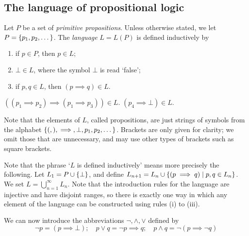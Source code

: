 \subsection{The language of propositional logic}
Let \( P \) be a set of \emph{primitive propositions}.
Unless otherwise stated, we let \( P = \qty{p_1, p_2, \dots} \).
The \emph{language} \( L = L(P) \) is defined inductively by
\begin{enumerate}
    \item if \( p \in P \), then \( p \in L \);
    \item \( \bot \in L \), where the symbol \( \bot \) is read `false';
    \item if \( p, q \in L \), then \( (p \implies q) \in L \).
\end{enumerate}
\begin{example}
    \( ((p_1 \implies p_2) \implies (p_1 \implies p_3)) \in L \).
    \( (p_4 \implies \bot) \in L \).
\end{example}
\begin{remark}
    Note that the elements of \( L \), called propositions, are just strings of symbols from the alphabet \( \qty{(, ), \implies, \bot, p_1, p_2, \dots} \).
    Brackets are only given for clarity; we omit those that are unnecessary, and may use other types of brackets such as square brackets.

    Note that the phrase `\( L \) is defined inductively' means more precisely the following.
    Let \( L_1 = P \cup \qty{\bot} \), and define \( L_{n+1} = L_n \cup \qty{(p \implies q) \mid p, q \in L_n} \).
    We set \( L = \bigcup_{n=1}^\infty L_n \).
    Note that the introduction rules for the language are injective and have disjoint ranges, so there is exactly one way in which any element of the language can be constructed using rules (i) to (iii).
\end{remark}
We can now introduce the abbreviations \( \neg, \wedge, \vee \) defined by
\[ \neg p = (p \implies \bot);\quad p \vee q = \neg p \implies q;\quad p \wedge q = \neg (p \implies \neg q) \]


